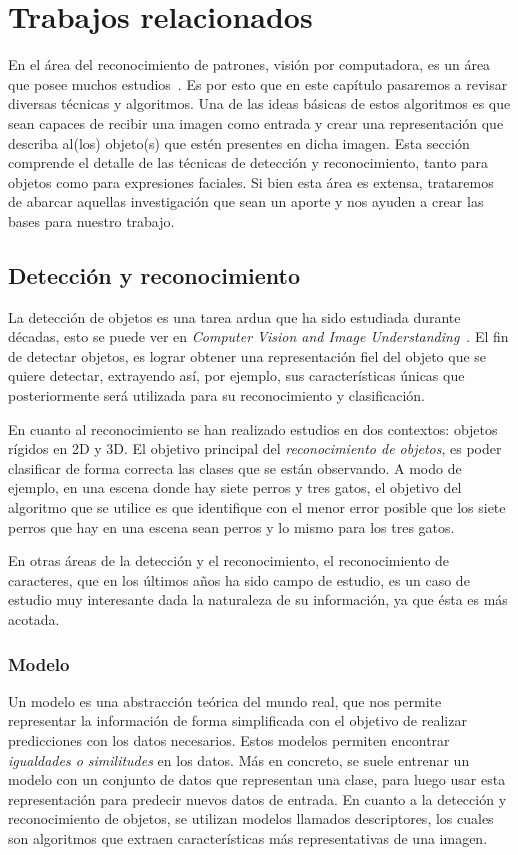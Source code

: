 \chapter[Trabajos relacionados ]{Trabajos relacionados }\label{ch:capitulo2}

En el área del reconocimiento de patrones, visión por computadora, es un área que posee muchos estudios~\cite{survey2005}. Es por esto que en este capítulo pasaremos a revisar diversas técnicas y algoritmos. Una de las ideas básicas de estos algoritmos es que sean capaces de recibir una imagen como entrada y crear una representación que describa al(los) objeto(s) que estén presentes en dicha imagen. Esta sección comprende el detalle de las técnicas de detección y reconocimiento, tanto para objetos como para expresiones faciales. Si bien esta área es extensa, trataremos de abarcar aquellas investigación que sean un aporte y nos ayuden a crear las bases para nuestro trabajo.

\section{Detección y reconocimiento}
La detección de objetos es una tarea ardua que ha sido estudiada durante décadas, esto se puede ver en \textit{Computer Vision and Image Understanding}~\cite{survey2005}. El fin de detectar objetos, es lograr obtener una representación fiel del objeto que se quiere detectar, extrayendo así, por ejemplo, sus características únicas que posteriormente será utilizada para su reconocimiento y clasificación.

En cuanto al reconocimiento se han realizado estudios en dos contextos: objetos rígidos en 2D y 3D. El objetivo principal del \textit{reconocimiento de objetos}, es poder clasificar de forma correcta las clases que se están observando. A modo de ejemplo, en una escena donde hay siete perros y tres gatos, el objetivo del algoritmo que se utilice es que identifique con el menor error posible que los siete perros que hay en una escena sean perros y lo mismo para los tres gatos.

En otras áreas de la detección y el reconocimiento, el reconocimiento de caracteres, que en los últimos años ha sido campo de estudio, es un caso de estudio muy interesante dada la naturaleza de su información, ya que ésta es más acotada. 

\subsection{Modelo}
\label{subsec:modelo}
Un modelo es una abstracción teórica del mundo real, que nos permite representar la información de forma simplificada con el objetivo de realizar predicciones con los datos necesarios. Estos modelos permiten encontrar \textit{igualdades o similitudes} en los datos. Más en concreto, se suele entrenar un modelo con un conjunto de datos que representan una clase, para luego usar esta representación para predecir nuevos datos de entrada. En cuanto a la detección y reconocimiento de objetos, se utilizan modelos llamados descriptores, los cuales son algoritmos que extraen características más representativas de una imagen. 

